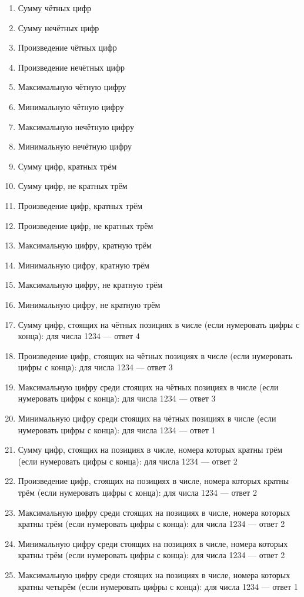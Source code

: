 \begin{enumerate}
\item Сумму чётных цифр
\item Сумму нечётных цифр
\item Произведение чётных цифр
\item Произведение нечётных цифр
\item Максимальную чётную цифру
\item Минимальную чётную цифру
\item Максимальную нечётную цифру
\item Минимальную нечётную цифру
\item Сумму цифр, кратных трём
\item Сумму цифр, не кратных трём
\item Произведение цифр, кратных трём
\item Произведение цифр, не кратных трём
\item Максимальную цифру, кратную трём
\item Минимальную цифру, кратную трём
\item Максимальную цифру, не кратную трём
\item Минимальную цифру, не кратную трём
\item Сумму цифр, стоящих на чётных позициях в числе (если нумеровать цифры с конца): для числа 1234 — ответ 4
\item Произведение цифр, стоящих на чётных позициях в числе (если нумеровать цифры с конца): для числа 1234 — ответ 3
\item Максимальную цифру среди стоящих на чётных позициях в числе (если нумеровать цифры с конца): для числа 1234 — ответ 3
\item Минимальную цифру среди стоящих на чётных позициях в числе (если нумеровать цифры с конца): для числа 1234 — ответ 1
\item Сумму цифр, стоящих на позициях в числе, номера которых кратны трём (если нумеровать цифры с конца): для числа 1234 — ответ 2
\item Произведение цифр, стоящих на позициях в числе, номера которых кратны трём (если нумеровать цифры с конца): для числа 1234 — ответ 2
\item Максимальную цифру среди стоящих на позициях в числе, номера которых кратны трём (если нумеровать цифры с конца): для числа 1234 — ответ 2
\item Минимальную цифру среди стоящих на позициях в числе, номера которых кратны трём (если нумеровать цифры с конца): для числа 1234 — ответ 2
\item Максимальную цифру среди стоящих на позициях в числе, номера которых кратны четырём (если нумеровать цифры с конца): для числа 1234 — ответ 1
\end{enumerate}

